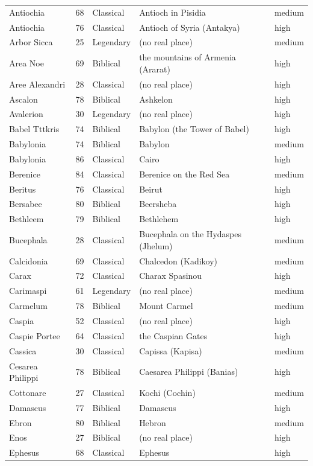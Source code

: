 \documentclass[11pt,a4paper]{article}
\begin{document}
{\begin{longtable}{p{3.2cm}rlp{6.6cm}l}
Antiochia & 68 & Classical & Antioch in Pisidia & medium\\
Antiochia & 76 & Classical & Antioch of Syria (Antakya) & high\\
Arbor Sicca & 25 & Legendary & (no real place) & medium\\
Area Noe & 69 & Biblical & the mountains of Armenia (Ararat) & high\\
Aree Alexandri & 28 & Classical & (no real place) & high\\
Ascalon & 78 & Biblical & Ashkelon & high\\
Avalerion & 30 & Legendary & (no real place) & high\\
Babel Tttkris & 74 & Biblical & Babylon (the Tower of Babel) & high\\
Babylonia & 74 & Biblical & Babylon & medium\\
Babylonia & 86 & Classical & Cairo & high\\
Berenice & 84 & Classical & Berenice on the Red Sea & medium\\
Beritus & 76 & Classical & Beirut & high\\
Bersabee & 80 & Biblical & Beersheba & high\\
Bethleem & 79 & Biblical & Bethlehem & high\\
Bucephala & 28 & Classical & Bucephala on the Hydaspes (Jhelum) & medium\\
Calcidonia & 69 & Classical & Chalcedon (Kadikoy) & medium\\
Carax & 72 & Classical & Charax Spasinou & high\\
Carimaspi & 61 & Legendary & (no real place) & medium\\
Carmelum & 78 & Biblical & Mount Carmel & medium\\
Caspia & 52 & Classical & (no real place) & high\\
Caspie Portee & 64 & Classical & the Caspian Gates & high\\
Cassica & 30 & Classical & Capissa (Kapisa) & medium\\
Cesarea Philippi & 78 & Biblical & Caesarea Philippi (Banias) & high\\
Cottonare & 27 & Classical & Kochi (Cochin) & medium\\
Damascus & 77 & Biblical & Damascus & high\\
Ebron & 80 & Biblical & Hebron & medium\\
Enos & 27 & Biblical & (no real place) & high\\
Ephesus & 68 & Classical & Ephesus & high\\

\end{longtable}}
\end{document}
